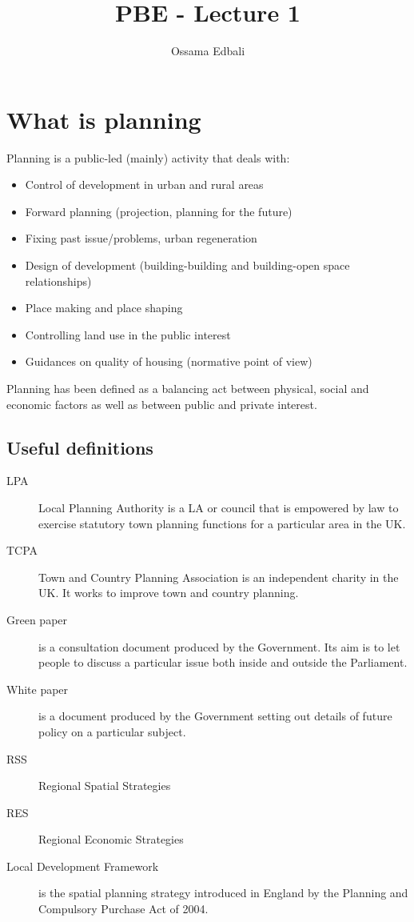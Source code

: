 \documentclass{article}
\title{PBE - Lecture 1}
\author{Ossama Edbali}
\begin{document}
	
	\maketitle	
	
	\section{What is planning}
	Planning is a public-led (mainly) activity that deals with:
	\begin{itemize}
		\item Control of development in urban and rural areas
		\item Forward planning (projection, planning for the future)
		\item Fixing past issue/problems, urban regeneration
		\item Design of development (building-building and building-open space relationships)
		\item Place making and place shaping
		\item Controlling land use in the public interest
		\item Guidances on quality of housing (normative point of view)
	\end{itemize} 
	
	Planning has been defined as a balancing act between physical, social and economic factors as well
	as between public and private interest.	
	
	\subsection*{Useful definitions}
	\begin{description}
		\item[LPA] Local Planning Authority is a LA or council that is empowered by law to exercise statutory
		town planning functions for a particular area in the UK.
		\item[TCPA] Town and Country Planning Association is an independent charity in the UK. It works
		to improve town and country planning.
		\item[Green paper] is a consultation document produced by the Government. Its aim is to let people
		to discuss a particular issue both inside and outside the Parliament. 
		\item[White paper] is a document produced by the Government setting out details
		of future policy on a particular subject.
		\item[RSS] Regional Spatial Strategies
		\item[RES] Regional Economic Strategies
		\item[Local Development Framework] is the spatial planning strategy introduced in England by the
		Planning and Compulsory Purchase Act of 2004.
	\end{description}
	
\end{document}
